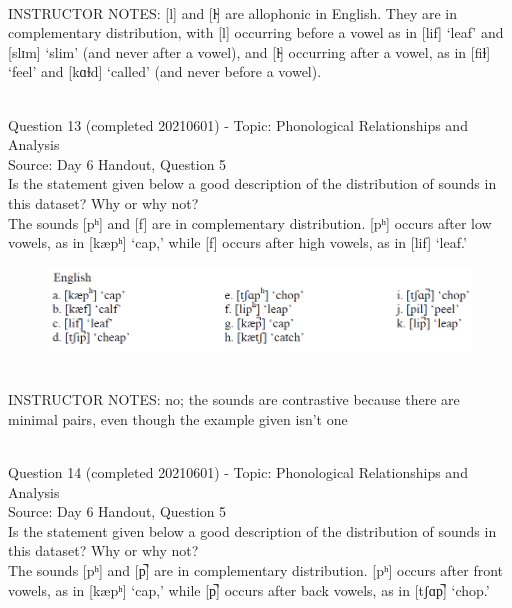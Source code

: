 \documentclass[12pt]{article}
\begin{document}
~\\
INSTRUCTOR NOTES: [l] and [l̴] are allophonic in English. They are in complementary distribution, with [l] occurring before a vowel as in [lif] ‘leaf’ and [slɪm] ‘slim’ (and never after a vowel), and [l̴] occurring after a vowel, as in [fiɫ] ‘feel’ and [kɑɫd] ‘called’ (and never before a vowel).


~\\

{\large Question 13} (completed 20210601) - Topic: Phonological Relationships and Analysis\\
Source: Day 6 Handout, Question 5\\

Is the statement given below a good description of the distribution of sounds in this dataset? Why or why not?\\

The sounds {[pʰ]} and {[f]} are in complementary distribution. {[pʰ]} occurs after low vowels, as in {[kæpʰ]} ‘cap,’ while {[f]} occurs after high vowels, as in {[lif]} ‘leaf.’

\begin{figure}[H]
\includegraphics{../images/english_labials.png}
\end{figure}

~\\
INSTRUCTOR NOTES: no; the sounds are contrastive because there are minimal pairs, even though the example given isn't one


~\\

{\large Question 14} (completed 20210601) - Topic: Phonological Relationships and Analysis\\
Source: Day 6 Handout, Question 5\\

Is the statement given below a good description of the distribution of sounds in this dataset? Why or why not?\\

The sounds {[pʰ]} and {[p̚]} are in complementary distribution. {[pʰ]} occurs after front vowels, as in {[kæpʰ]} ‘cap,’ while {[p̚]} occurs after back vowels, as in {[tʃɑp̚]} ‘chop.’
\end{document}
